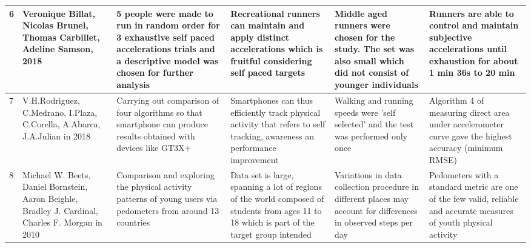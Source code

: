 \documentclass[10pt, a4paper]{article}
\begin{document}
\begin{landscape}
\begin{center}
\begin{tabular}{ | m{0.5cm} | m{3.5cm}| m{5cm} | m{4.5cm}| m{5cm}| m{5.5cm}|}
\hline
6 & Veronique Billat, Nicolas Brunel, Thomas Carbillet, Adeline Samson, 2018 & 5 people were made to run in random order for 3 exhaustive self paced accelerations trials and a descriptive model was chosen for further analysis & Recreational runners can maintain and apply distinct accelerations which is fruitful considering self paced targets & Middle aged runners were chosen for the study. The set was also small which did not consist of younger individuals & Runners are able to control and maintain subjective accelerations until exhaustion for about 1 min 36s to 20 min \\ 
\hline
7 &  V.H.Rodriguez, C.Medrano, I.Plaza, C.Corella, A.Abarca, J.A.Julian in 2018 & Carrying out comparison of four algorithms so that smartphone can produce results obtained with devices like GT3X+ & Smartphones can thus efficiently track physical activity that refers to self tracking, awareness an performance improvement & Walking and running speeds were 'self selected' and the test was performed only once & Algorithm 4 of measuring direct area under accelerometer curve gave the highest accuracy (minimum RMSE) \\ 
\hline
8 & Michael W. Beets, Daniel Bornstein, Aaron Beighle,
Bradley J. Cardinal, Charles F. Morgan in 2010 & Comparison and exploring the physical activity patterns of young users via pedometers from around 13 countries & Data set is large, spanning a lot of regions of the world composed of students from ages 11 to 18 which is part of the target group intended & Variations in data collection procedure in different places may account for differences in observed steps per day & Pedometers with a standard metric are one of the few valid, reliable and accurate measures of youth physical activity \\ 
\hline
\end{tabular}
\end{center}

\end{landscape}
\end{document}
